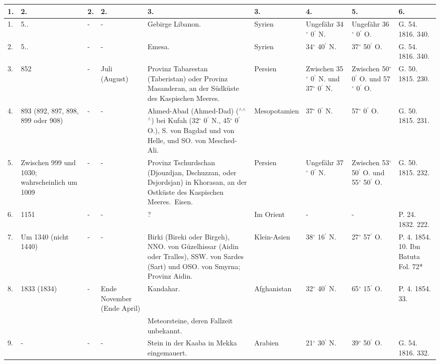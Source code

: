 \documentclass[a4paper, 11pt, oneside, polutonikogreek, german]{article}
\begin{document}
\begin{table}[!ht]
    \centering
    \begin{tabular}{|l|l|l|l|l|l|l|l|l|}
    \hline
        1. & 2. & 2. & 2. & 3. & 3. & 4. & 5. & 6. \\ \hline
        1. & 5.. & - & - & Gebirge Libanon. & Syrien & Ungefähr 34$^\circ$ 0$^\prime$ N. & Ungefähr 36$^\circ$ 0$^\prime$ O. & G. 54. 1816. 340. \\ \hline
        2. & 5.. & - & - & Emesa. & Syrien & 34$^\circ$ 40$^\prime$ N. & 37$^\circ$ 50$^\prime$ O. & G. 54. 1816. 340. \\ \hline
        3. & 852 & - & Juli (August) & Provinz Tabarestan (Taberistan) oder Provinz Masanderan, an der Südküste des Kaspischen Meeres. & Persien & Zwischen 35$^\circ$ 0$^\prime$ N. und 37$^\circ$ 0$^\prime$ N. & Zwischen 50$^\circ$ 0$^\prime$ O. und 57$^\circ$ 0$^\prime$ O. & G. 50. 1815. 230. \\ \hline
        4. & 893 (892, 897, 898, 899 oder 908) & - & - & Ahmed-Abad (Ahmed-Dad) ($^\wedge$$^\wedge$$^\wedge$) bei Kufah (32$^\circ$ 0$^\prime$ N., 45$^\circ$ 0$^\prime$ O.), S. von Bagdad und von Helle, und SO. von Mesched-Ali. & Mesopotamien & 37$^\circ$ 0$^\prime$ N. & 57$^\circ$ 0$^\prime$ O. & G. 50. 1815. 231. \\ \hline
        5. & Zwischen 999 und 1030; wahrscheinlich um 1009 & - & - & Provinz Tschurdschan (Djouzdjan, Dschuzzan, oder Dsjordsjan) in Khorasan, an der Ostküste des Kaspischen Meeres. Eisen. & Persien & Ungefähr 37$^\circ$ 0$^\prime$ N. & Zwischen 53$^\circ$ 50$^\prime$ O. und 55$^\circ$ 50$^\prime$ O. & G. 50. 1815. 232. \\ \hline
        6. & 1151 & - & - & ? & Im Orient & - & - & P. 24. 1832. 222. \\ \hline
        7. & Um 1340 (nicht 1440) & - & - & Birki (Bireki oder Birgeh), NNO. von Güzelhissar (Aidin oder Tralles), SSW. von Sardes (Sart) und OSO. von Smyrna; Provinz Aidin. & Klein-Asien & 38$^\circ$ 16$^\prime$ N. & 27$^\circ$ 57$^\prime$ O. & P. 4. 1854. 10. Ibn Batuta Fol. 72* \\ \hline
        8. & 1833 (1834) & - & Ende November (Ende April) & Kandahar. & Afghanistan & 32$^\circ$ 40$^\prime$ N. & 65$^\circ$ 15$^\prime$ O. & P. 4. 1854. 33. \\ \hline
          &   &   &   & Meteorsteine, deren Fallzeit unbekannt. &   &   &   &   \\ \hline
        9. & - & - & - & Stein in der Kaaba in Mekka eingemauert. & Arabien & 21$^\circ$ 30$^\prime$ N. & 39$^\circ$ 50$^\prime$ O. & G. 54. 1816. 332. \\ \hline

\end{tabular}
\end{table}
\end{document}
